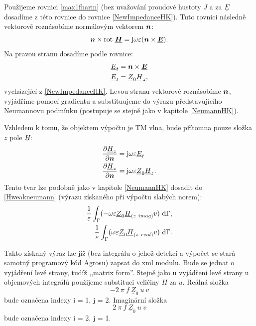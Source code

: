 \documentclass[12pt,a4paper,oneside]{article}
\numberwithin{equation}{section} %
\numberwithin{figure}{section} %
\numberwithin{table}{section} %
\newcommand{\mj}{\mathrm{j}} %
\renewcommand{\vec}[1]{\mbox{\boldmath$#1$}} %
\newcommand{\faz}[1]{{\underline{#1}}} %
\newcommand{\rot}{\mathrm{rot}\ }
\begin{document}
Použijeme rovnici \ref{max1fharm} (bez uvažování proudové hustoty $J$ a za $\faz{E}$ dosadíme z této rovnice do rovnice \ref{NewImpedanceHK}). Tuto rovnici následně vektorově roznásobíme normálovým vektorem $\vec{n}$:
\begin{equation}
\vec{n} \times \rot \faz{\vec{H}} = \mj \omega \varepsilon (\vec{n} \times \faz{\vec{E}}) .
\end{equation}
Na pravou stranu dosadíme podle rovnice:
\begin{subequations}
\begin{align}
\faz{E} _t &= \vec{n} \times \faz{\vec{E}}
\\
\faz{E} _t &= \faz{Z} _0 \faz{H} _z ,
\end{align}
\end{subequations}
vycházející z \ref{NewImpedanceHK}. Levou stranu vektorově roznásobíme $\vec{n}$, vyjádříme pomocí gradientu a substituujeme do výrazu představujícího Neumannovu podmínku (postupuje se stejně jako v kapitole \ref{NeumannHK}).

Vzhledem k tomu, že objektem výpočtu je TM vlna, bude přítomna pouze složka $z$ pole $\faz{H}$:
\begin{subequations}
\begin{align}
\frac{\partial \faz{H} _z}{\partial \vec{n}} &= \mj \omega \varepsilon \faz{E} _t
\\
\frac{\partial \faz{H} _z}{\partial \vec{n}} &= \mj \omega \varepsilon \faz{Z} _0 \faz{H} _z .
\end{align}
\end{subequations}
Tento tvar lze podobně jako v kapitole \ref{NeumannHK} dosadit do \ref{Hweakneumann} (výrazu získaného při výpočtu slabých norem):
\begin{subequations}
\begin{align}
\frac{1}{\varepsilon} \int _{\Gamma} ( - \omega \varepsilon \faz{Z} _0 \faz{H} _{(z~imag)} v ) ~ \ud \Gamma ,
\\ 
\frac{1}{\varepsilon} \int _{\Gamma} ( \omega \varepsilon \faz{Z} _0\faz{H} _{(z~real)} v ) ~ \ud \Gamma .
\end{align}
\end{subequations}

Takto získaný výraz lze již (bez integrálu o jehož detekci a výpočet se stará samotný programový kód Agrosu) zapsat do xml modulu. Bude se jednat o vyjádření levé strany, tudíž ,,matrix form''. Stejně jako u vyjádření levé strany u objemových integrálů použijeme substituci veličiny $H$ za $u$. Reálná složka 
\begin{equation}
- 2 ~ \pi ~ f ~ \faz{Z} _0 ~ u ~ v
\end{equation} 
bude označena indexy i = 1, j = 2. Imaginární složka 
\begin{equation}
2 ~ \pi ~ f ~ \faz{Z} _0 ~ u ~ v
\end{equation}
bude označena indexy i = 2, j = 1.
\end{document}
